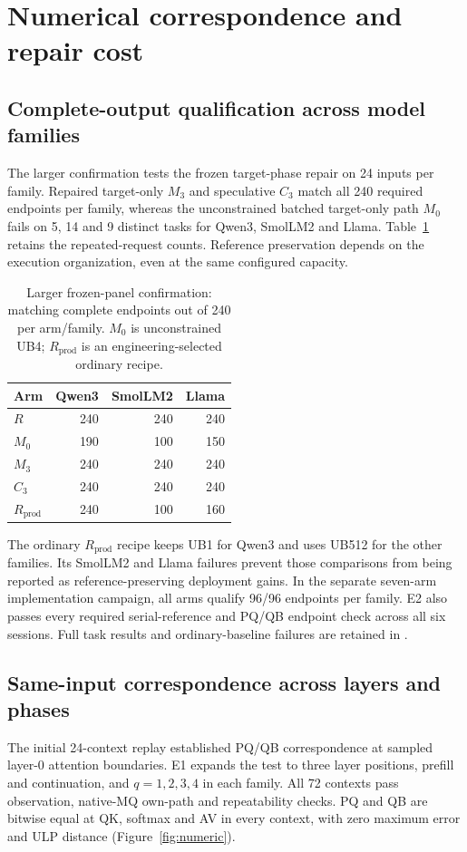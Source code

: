 \section{Numerical correspondence and repair cost}
\label{sec:results}
\subsection{Complete-output qualification across model families}
The larger confirmation tests the frozen target-phase repair on 24 inputs per family. Repaired target-only $M_3$ and speculative $C_3$ match all 240 required endpoints per family, whereas the unconstrained batched target-only path $M_0$ fails on 5, 14 and 9 distinct tasks for Qwen3, SmolLM2 and Llama. Table~\ref{tab:qualification} retains the repeated-request counts. Reference preservation depends on the execution organization, even at the same configured capacity.

\begin{table}[t]\centering\small
\caption{Larger frozen-panel confirmation: matching complete endpoints out of 240 per arm/family. $M_0$ is unconstrained UB4; $R_{\mathrm{prod}}$ is an engineering-selected ordinary recipe.}
\label{tab:qualification}
\begin{tabular}{lrrr}\toprule
Arm & Qwen3 & SmolLM2 & Llama\\\midrule
$R$ &240&240&240\\
$M_0$ &190&100&150\\
$M_3$ &240&240&240\\
$C_3$ &240&240&240\\
$R_{\mathrm{prod}}$ &240&100&160\\\bottomrule
\end{tabular}
\end{table}

The ordinary $R_{\mathrm{prod}}$ recipe keeps UB1 for Qwen3 and uses UB512 for the other families. Its SmolLM2 and Llama failures prevent those comparisons from being reported as reference-preserving deployment gains. In the separate seven-arm implementation campaign, all arms qualify 96/96 endpoints per family. E2 also passes every required serial-reference and PQ/QB endpoint check across all six sessions. Full task results and ordinary-baseline failures are retained in .

\subsection{Same-input correspondence across layers and phases}
\label{sec:numeric}
The initial 24-context replay established PQ/QB correspondence at sampled layer-0 attention boundaries. E1 expands the test to three layer positions, prefill and continuation, and $q=1,2,3,4$ in each family. All 72 contexts pass observation, native-MQ own-path and repeatability checks. PQ and QB are bitwise equal at QK, softmax and AV in every context, with zero maximum error and ULP distance (Figure~\ref{fig:numeric}).

